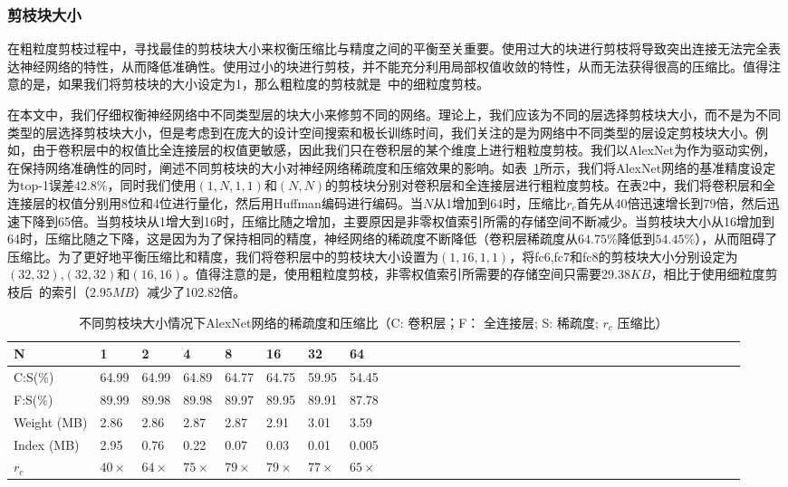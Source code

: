 \subsubsection{剪枝块大小}

在粗粒度剪枝过程中，寻找最佳的剪枝块大小来权衡压缩比与精度之间的平衡至关重要。使用过大的块进行剪枝将导致突出连接无法完全表达神经网络的特性，从而降低准确性。使用过小的块进行剪枝，并不能充分利用局部权值收敛的特性，从而无法获得很高的压缩比。值得注意的是，如果我们将剪枝块的大小设定为1，那么粗粒度的剪枝就是~\cite{han2015learning}中的细粒度剪枝。

在本文中，我们仔细权衡神经网络中不同类型层的块大小来修剪不同的网络。理论上，我们应该为不同的层选择剪枝块大小，而不是为不同类型的层选择剪枝块大小，但是考虑到在庞大的设计空间搜索和极长训练时间，我们关注的是为网络中不同类型的层设定剪枝块大小。例如，由于卷积层中的权值比全连接层的权值更敏感，因此我们只在卷积层的某个维度上进行粗粒度剪枝。我们以AlexNet为作为驱动实例，在保持网络准确性的同时，阐述不同剪枝块的大小对神经网络稀疏度和压缩效果的影响。如表~\ref{tab:blocksize}所示，我们将AlexNet网络的基准精度设定为top-1误差$42.8\%$，同时我们使用$(1,N,1,1)$和$(N,N)$的剪枝块分别对卷积层和全连接层进行粗粒度剪枝。在表2中，我们将卷积层和全连接层的权值分别用8位和4位进行量化，然后用Huffman编码进行编码。当$N$从1增加到64时，压缩比$r_c$首先从40倍迅速增长到79倍，然后迅速下降到65倍。当剪枝块从1增大到16时，压缩比随之增加，主要原因是非零权值索引所需的存储空间不断减少。当剪枝块大小从16增加到64时，压缩比随之下降，这是因为为了保持相同的精度，神经网络的稀疏度不断降低（卷积层稀疏度从$64.75\%$降低到$54.45\%$），从而阻碍了压缩比。为了更好地平衡压缩比和精度，我们将卷积层中的剪枝块大小设置为$(1,16,1,1)$，将fc6,fc7和fc8的剪枝块大小分别设定为$(32,32)$,$(32,32)$和$(16,16)$。值得注意的是，使用粗粒度剪枝，非零权值索引所需要的存储空间只需要$29.38KB$，相比于使用细粒度剪枝后~\cite{han2015deep}的索引（$2.95MB$）减少了102.82倍。

\begin{table}[b]
\centering
\caption{ 不同剪枝块大小情况下AlexNet网络的稀疏度和压缩比（C: 卷积层；F： 全连接层; S: 稀疏度; $r_c$ 压缩比）}
\label{tab:blocksize}
\begin{tabular}{lll@{~}llll@{~}llll@{~}llll@{~~}llll@{~~}llll@{~~}llll@{~~}lllllllll}
\toprule
N  				& 1 	&  2		& 4			& 8			& 16		& 32 		&64		\\
\midrule
C:S(\%)			& 64.99 &64.99		&64.89		&64.77		&64.75		&59.95		&54.45 	\\
F:S(\%) 		& 89.99	&89.98		&89.98		&89.97		&89.95		&89.91		&87.78	\\
Weight (MB)     & 2.86 	&2.86		&2.87		&2.87		&2.91		&3.01		&3.59	\\
Index (MB)      & 2.95	&0.76		&0.22		&0.07		&0.03		&0.01		&0.005	\\
$r_c$ 			& $40\times$ 	&$64\times$		&$75\times$		&$79\times$		&$79\times$		&$77\times$		&$65\times$	\\
\bottomrule
\end{tabular}
\end{table}

